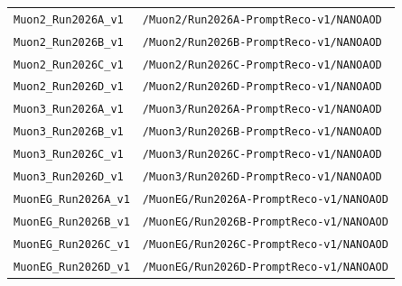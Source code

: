 \begin{longtable}{@{}>{\RaggedRight\arraybackslash}p{} >{\RaggedRight\arraybackslash}p{}@{}}
\addlinespace[2pt]
\texttt{Muon2\_\allowbreak{}Run2026A\_\allowbreak{}v1} & \texttt{/\allowbreak{}Muon2/\allowbreak{}Run2026A-\allowbreak{}PromptReco-\allowbreak{}v1/\allowbreak{}NANOAOD} \\
\addlinespace[2pt]
\texttt{Muon2\_\allowbreak{}Run2026B\_\allowbreak{}v1} & \texttt{/\allowbreak{}Muon2/\allowbreak{}Run2026B-\allowbreak{}PromptReco-\allowbreak{}v1/\allowbreak{}NANOAOD} \\
\addlinespace[2pt]
\texttt{Muon2\_\allowbreak{}Run2026C\_\allowbreak{}v1} & \texttt{/\allowbreak{}Muon2/\allowbreak{}Run2026C-\allowbreak{}PromptReco-\allowbreak{}v1/\allowbreak{}NANOAOD} \\
\addlinespace[2pt]
\texttt{Muon2\_\allowbreak{}Run2026D\_\allowbreak{}v1} & \texttt{/\allowbreak{}Muon2/\allowbreak{}Run2026D-\allowbreak{}PromptReco-\allowbreak{}v1/\allowbreak{}NANOAOD} \\
\addlinespace[2pt]
\texttt{Muon3\_\allowbreak{}Run2026A\_\allowbreak{}v1} & \texttt{/\allowbreak{}Muon3/\allowbreak{}Run2026A-\allowbreak{}PromptReco-\allowbreak{}v1/\allowbreak{}NANOAOD} \\
\addlinespace[2pt]
\texttt{Muon3\_\allowbreak{}Run2026B\_\allowbreak{}v1} & \texttt{/\allowbreak{}Muon3/\allowbreak{}Run2026B-\allowbreak{}PromptReco-\allowbreak{}v1/\allowbreak{}NANOAOD} \\
\addlinespace[2pt]
\texttt{Muon3\_\allowbreak{}Run2026C\_\allowbreak{}v1} & \texttt{/\allowbreak{}Muon3/\allowbreak{}Run2026C-\allowbreak{}PromptReco-\allowbreak{}v1/\allowbreak{}NANOAOD} \\
\addlinespace[2pt]
\texttt{Muon3\_\allowbreak{}Run2026D\_\allowbreak{}v1} & \texttt{/\allowbreak{}Muon3/\allowbreak{}Run2026D-\allowbreak{}PromptReco-\allowbreak{}v1/\allowbreak{}NANOAOD} \\
\addlinespace[2pt]
\texttt{MuonEG\_\allowbreak{}Run2026A\_\allowbreak{}v1} & \texttt{/\allowbreak{}MuonEG/\allowbreak{}Run2026A-\allowbreak{}PromptReco-\allowbreak{}v1/\allowbreak{}NANOAOD} \\
\addlinespace[2pt]
\texttt{MuonEG\_\allowbreak{}Run2026B\_\allowbreak{}v1} & \texttt{/\allowbreak{}MuonEG/\allowbreak{}Run2026B-\allowbreak{}PromptReco-\allowbreak{}v1/\allowbreak{}NANOAOD} \\
\addlinespace[2pt]
\texttt{MuonEG\_\allowbreak{}Run2026C\_\allowbreak{}v1} & \texttt{/\allowbreak{}MuonEG/\allowbreak{}Run2026C-\allowbreak{}PromptReco-\allowbreak{}v1/\allowbreak{}NANOAOD} \\
\addlinespace[2pt]
\texttt{MuonEG\_\allowbreak{}Run2026D\_\allowbreak{}v1} & \texttt{/\allowbreak{}MuonEG/\allowbreak{}Run2026D-\allowbreak{}PromptReco-\allowbreak{}v1/\allowbreak{}NANOAOD} \\

\end{longtable}
